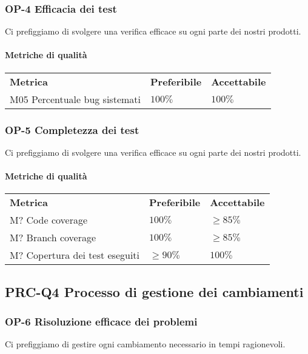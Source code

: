 		\subsubsection{OP-4 Efficacia dei test}
			Ci prefiggiamo di svolgere una verifica efficace su ogni parte dei nostri prodotti\glo.
			\paragraph{Metriche di qualità} \mbox{}
			\begin{longtable} {
					>{}p{80mm} 
					>{}p{25mm}
					>{}p{25mm}
				}
				\rowcolor{gray!50}
				\textbf{Metrica} & \textbf{Preferibile} & \textbf{Accettabile} \TBstrut \TBstrut \\
				M05 Percentuale bug sistemati & $100\%$ & $100\%$ \TBstrut \\ [2mm]
			\end{longtable}
		\subsubsection{OP-5 Completezza dei test}
		Ci prefiggiamo di svolgere una verifica efficace su ogni parte dei nostri prodotti\glo.
		\paragraph{Metriche di qualità} \mbox{}
		\begin{longtable} {
				>{}p{80mm} 
				>{}p{25mm}
				>{}p{25mm}
			}
			\rowcolor{gray!50}
			\textbf{Metrica} & \textbf{Preferibile} & \textbf{Accettabile} \TBstrut \TBstrut \\
			M? Code coverage & $100\%$ & $\ge 85\%$ \TBstrut \\ [2mm]
			M? Branch coverage & $100\%$ & $\ge 85\%$ \TBstrut \\ [2mm]
			M? Copertura dei test eseguiti & $\ge 90\%$ & $100\%$ \TBstrut \\ [2mm]
		\end{longtable}	
			
	\subsection{PRC-Q4 Processo di gestione dei cambiamenti}
		\subsubsection{OP-6 Risoluzione efficace dei problemi}
			Ci prefiggiamo di gestire ogni cambiamento necessario in tempi ragionevoli.
